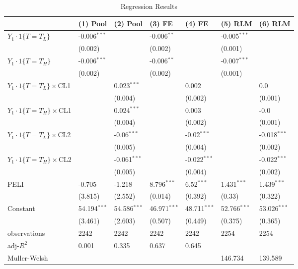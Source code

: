 \documentclass[12pt]{article}
\begin{document}
\begin{table}
    \caption{Regression Results}
    \vspace*{12pt}
    \centering

      \begin{tabular}{lllllll}
\hline
 & (1) Pool & (2) Pool & (3) FE & (4) FE & (5) RLM & (6) RLM \\
\hline
$Y_1\cdot1\{T=T_L\}$ & -0.006$^{***}$ &  & -0.006$^{**}$ &  & -0.005$^{***}$ &  \\
 & (0.002) &  & (0.002) &  & (0.001) &  \\
$Y_1\cdot1\{T=T_H\}$ & -0.006$^{***}$ &  & -0.006$^{**}$ &  & -0.007$^{***}$ &  \\
 & (0.002) &  & (0.002) &  & (0.001) &  \\
$Y_1\cdot1\{T=T_L\}\times$CL1 &  & 0.023$^{***}$ &  & 0.002 &  & 0.0 \\
 &  & (0.004) &  & (0.002) &  & (0.001) \\
$Y_1\cdot1\{T=T_H\}\times$CL1 &  & 0.024$^{***}$ &  & 0.003 &  & -0.0 \\
 &  & (0.004) &  & (0.002) &  & (0.001) \\
$Y_1\cdot1\{T=T_L\}\times$CL2 &  & -0.06$^{***}$ &  & -0.02$^{***}$ &  & -0.018$^{***}$ \\
 &  & (0.005) &  & (0.004) &  & (0.002) \\
$Y_1\cdot1\{T=T_H\}\times$CL2 &  & -0.061$^{***}$ &  & -0.022$^{***}$ &  & -0.022$^{***}$ \\
 &  & (0.005) &  & (0.004) &  & (0.002) \\
PELI & -0.705 & -1.218 & 8.796$^{***}$ & 6.52$^{***}$ & 1.431$^{***}$ & 1.439$^{***}$ \\
 & (3.815) & (2.552) & (0.014) & (0.392) & (0.33) & (0.322) \\
Constant & 54.194$^{***}$ & 54.586$^{***}$ & 46.971$^{***}$ & 48.711$^{***}$ & 52.766$^{***}$ & 53.026$^{***}$ \\
 & (3.461) & (2.603) & (0.507) & (0.449) & (0.375) & (0.365) \\\hline

observations & 2242 & 2242 & 2242 & 2242 & 2254 & 2254 \\
adj-$R^2$ & 0.001 & 0.335 & 0.637 & 0.645 &  &  \\
Muller-Welsh &  &  &  &  & 146.734 & 139.589 \\
\hline
\end{tabular}


\end{table}
\end{document}
